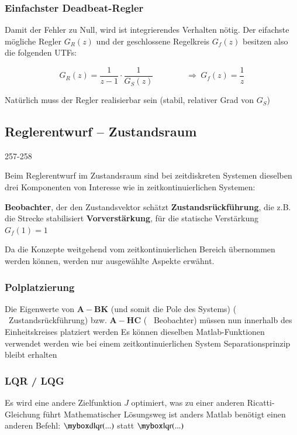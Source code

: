 \subsubsection{Einfachster Deadbeat-Regler}

Damit der Fehler zu Null, wird ist integrierendes Verhalten nötig. 
Der eifachste mögliche Regler $G_R(z)$ und der geschlossene Regelkreis $G_f(z)$ besitzen also die folgenden UTFs:

$$ G_R(z) = \frac{1}{z-1} \cdot \frac{1}{G_S(z)} \qquad \qquad \Rightarrow\ G_f(z) = \frac{1}{z} $$

Natürlich muss der Regler realisierbar sein (stabil, relativer Grad von $G_S$)


\subsection{Reglerentwurf -- Zustandsraum}{257-258}

Beim Reglerentwurf im Zustandsraum sind bei zeitdiskreten Systemen dieselben drei Komponenten von Interesse wie in zeitkontinuierlichen Systemen:

\smallskip

\begin{outline}
    \1 \textbf{Beobachter}, der den Zustandsvektor schätzt
    \1 \textbf{Zustandsrückführung}, die z.B. die Strecke stabilisiert
    \1 \textbf{Vorverstärkung}, für die statische Verstärkung \textrightarrow\ $G_f(1) = 1$
\end{outline}

\smallskip

Da die Konzepte weitgehend vom zeitkontinuierlichen Bereich übernommen werden können, werden nur ausgewählte Aspekte erwähnt.


\subsubsection{Polplatzierung}

\begin{outline}
    \1 Die Eigenwerte von $\bm{A} - \bm{BK}$ (und somit die Pole des Systems) ( \textrightarrow\ Zustandsrückführung) bzw. $\bm{A} - \bm{HC}$ ( \textrightarrow\ Beobachter) müssen nun innerhalb des Einheitskreises platziert werden
    \1 Es können dieselben Matlab-Funktionen verwendet werden wie bei einem zeitkontinuierlichen System
    \1 Separationsprinzip bleibt erhalten
\end{outline}


\subsubsection{LQR / LQG}

\begin{outline}
    \1 Es wird eine andere Zielfunktion $J$ optimiert, was zu einer anderen Ricatti-Gleichung führt
        \2 Mathematischer Lösungsweg ist anders
    \1 Matlab benötigt einen anderen Befehl: $\mylstbox{dlqr(...)}$ statt $\mylstbox{lqr(...)}$
\end{outline}


